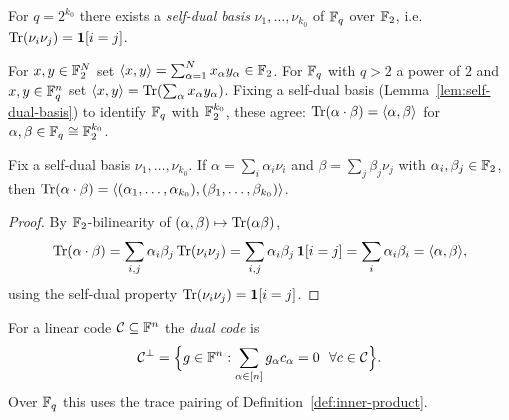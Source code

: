 \begin{lemma}
  \label{lem:self-dual-basis}
  \notready
  For $q = 2^{k_0}$ there exists a \emph{self-dual basis} $\nu_1,\dots,\nu_{k_0}$
  of $\mathbb{F}_q$ over $\mathbb{F}_2$, i.e.\ $\operatorname{Tr}(\nu_i \nu_j) = \mathbf{1}[i=j]$.
\end{lemma}

\begin{definition}
  \label{def:inner-product}
  For $x,y \in \mathbb{F}_2^N$ set $\langle x, y\rangle = \sum_{\alpha=1}^N x_\alpha y_\alpha
  \in \mathbb{F}_2$. For $\mathbb{F}_q$ with $q > 2$ a power of $2$ and $x,y \in \mathbb{F}_q^n$ set
  $\langle x, y\rangle = \operatorname{Tr}\!\left(\sum_\alpha x_\alpha y_\alpha\right)$. Fixing a
  self-dual basis (Lemma~\ref{lem:self-dual-basis}) to identify $\mathbb{F}_q$ with
  $\mathbb{F}_2^{k_0}$, these agree: $\operatorname{Tr}(\alpha\cdot\beta) = \langle \alpha, \beta\rangle$ for
  $\alpha,\beta \in \mathbb{F}_q \cong \mathbb{F}_2^{k_0}$.
\end{definition}

\begin{lemma}
  \label{lem:trace-inner-product}
  Fix a self-dual basis $\nu_1,\dots,\nu_{k_0}$. If
  $\alpha = \sum_i \alpha_i \nu_i$ and $\beta = \sum_j \beta_j \nu_j$ with
  $\alpha_i,\beta_j \in \mathbb{F}_2$, then
  $\operatorname{Tr}(\alpha\cdot\beta) = \langle (\alpha_1,\dots,\alpha_{k_0}), (\beta_1,\dots,\beta_{k_0})\rangle$.
\end{lemma}
\begin{proof}
  By $\mathbb{F}_2$-bilinearity of $(\alpha,\beta) \mapsto \operatorname{Tr}(\alpha\beta)$,
  \[
    \operatorname{Tr}(\alpha\cdot\beta) = \sum_{i,j} \alpha_i \beta_j \operatorname{Tr}(\nu_i\nu_j)
      = \sum_{i,j}\alpha_i\beta_j\,\mathbf{1}[i=j] = \sum_i \alpha_i\beta_i
      = \langle \alpha, \beta\rangle,
  \]
  using the self-dual property $\operatorname{Tr}(\nu_i\nu_j) = \mathbf{1}[i=j]$.
\end{proof}

\begin{definition}
  \label{def:dual-code}
  For a linear code $\mathcal{C} \subseteq \mathbb{F}^n$ the \emph{dual code} is
  \[
    \mathcal{C}^\perp = \Big\{ g \in \mathbb{F}^n : \sum_{\alpha \in [n]} g_\alpha c_\alpha = 0
      \ \ \forall c \in \mathcal{C} \Big\}.
  \]
  Over $\mathbb{F}_q$ this uses the trace pairing of Definition~\ref{def:inner-product}.
\end{definition}

